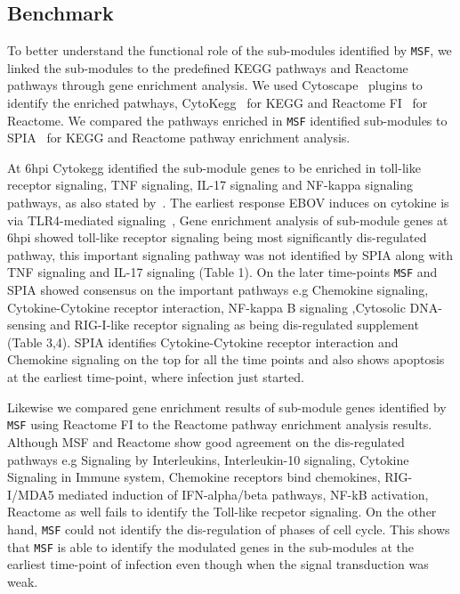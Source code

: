 \documentclass[twocolumn]{article}
\begin{document}
\subsection*{Benchmark} 

To better understand the functional role of the sub-modules identified by  \texttt{MSF}, we linked the  sub-modules to the predefined KEGG pathways and Reactome
pathways through gene enrichment analysis. We used Cytoscape~\cite{Cyto} plugins to identify the enriched patwhays, CytoKegg~\cite{Cytokegg} for KEGG and Reactome FI~\cite{Reactome} for Reactome. We compared the pathways enriched in \texttt{MSF} identified sub-modules to SPIA~\cite{Tarca} for KEGG and Reactome pathway enrichment analysis. 

At 6hpi Cytokegg identified the sub-module genes to be enriched in toll-like receptor signaling, TNF signaling, IL-17 signaling and NF-kappa signaling pathways, as also stated by~\cite{Olejnik}. The earliest response EBOV
induces on  cytokine is via TLR4-mediated signaling~\cite{Olejnik}, Gene enrichment analysis of sub-module genes at 6hpi showed toll-like receptor signaling being most significantly dis-regulated pathway, this important signaling pathway was not identified by SPIA along with TNF signaling and IL-17 signaling (Table 1). On the later time-points \texttt{MSF} and SPIA showed consensus on the important pathways e.g Chemokine signaling, Cytokine-Cytokine receptor interaction, NF-kappa B signaling ,Cytosolic DNA-sensing  and RIG-I-like receptor signaling as being dis-regulated supplement (Table 3,4). SPIA identifies Cytokine-Cytokine receptor interaction and Chemokine signaling on the top for all the time
points and also shows apoptosis at the earliest time-point, where infection
just started.

Likewise we compared gene enrichment results of sub-module genes identified by \texttt{MSF} using Reactome FI to the Reactome pathway enrichment analysis results. Although MSF and Reactome show good agreement on the dis-regulated pathways e.g Signaling by Interleukins, Interleukin-10 signaling, Cytokine Signaling in Immune system, Chemokine receptors bind chemokines, RIG-I/MDA5 mediated induction of IFN-alpha/beta pathways, NF-kB activation, Reactome as well fails to identify the Toll-like recpetor signaling. On the other hand, \texttt{MSF} could not identify the dis-regulation of phases of cell cycle. This shows that \texttt{MSF} is able to identify the modulated genes in the sub-modules at the earliest time-point of infection even though when the signal transduction was weak.
\end{document}
